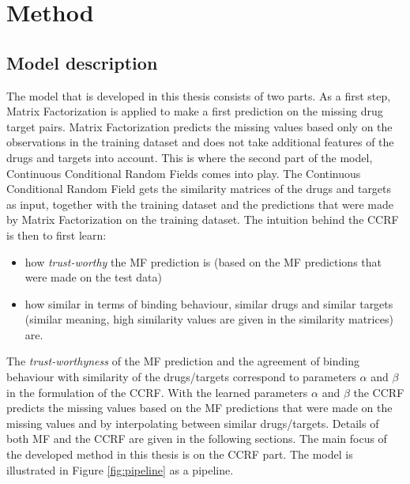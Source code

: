 
\chapter{Method}

\section{Model description}
The model that is developed in this thesis consists of two parts. As a first step, Matrix Factorization is applied to make a first prediction on the missing drug target pairs. Matrix Factorization predicts the missing values based only on the observations in the training dataset and does not take additional features of the drugs and targets into account. This is where the second part of the model, Continuous Conditional Random Fields comes into play. The Continuous Conditional Random Field gets the similarity matrices of the drugs and targets as input, together with the training dataset and the predictions that were made by Matrix Factorization on the training dataset. The intuition behind the CCRF is then to first learn:
\begin{itemize}
\item how \textit{trust-worthy} the MF prediction is (based on the MF predictions that were made on the test data)
\item how similar in terms of binding behaviour, similar drugs and similar targets (similar meaning, high similarity values are given in the similarity matrices) are.
\end{itemize}

The \textit{trust-worthyness} of the MF prediction and the agreement of binding behaviour with similarity of the drugs/targets correspond to parameters $\alpha$ and $\beta$ in the formulation of the CCRF. With the learned parameters $\alpha$ and $\beta$ the CCRF predicts the missing values based on the MF predictions that were made on the missing values and by interpolating between similar drugs/targets. Details of both MF and the CCRF are given in the following sections. The main focus of the developed method in this thesis is on the CCRF part. The model is illustrated in Figure \ref{fig:pipeline} as a pipeline.

